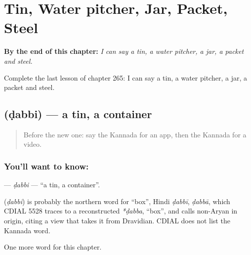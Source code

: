 
\chapter{Tin, Water pitcher, Jar, Packet, Steel}
\label{ch:ka-tin-water-pitcher-jar-packet-steel}

\begin{chapteropening}
\textbf{By the end of this chapter:} \emph{I can say a tin, a water pitcher, a jar, a packet and steel.}

Complete the last lesson of chapter 265: I can say a tin, a water pitcher, a jar, a packet and steel.
\end{chapteropening}

\section[\texorpdfstring{\kn{ಡಬ್ಬಿ} (ḍabbi)}{ಡಬ್ಬಿ (ḍabbi)}]{ (ḍabbi) — a tin, a container}

\label{lesson:KA-C265-dabbi}



\begin{quote}
Before the new one: say the Kannada for an app, then the Kannada for a video.
\end{quote}

\subsection*{You'll want to know: }
\textbf{} — \emph{ḍabbi} — \textquotedblleft{}a tin, a container\textquotedblright{}.

\begin{cousinweb}
\textbf{} (\emph{ḍabbi}) is probably the northern word for \textquotedblleft{}box\textquotedblright{}, Hindi \emph{ḍabbī}, \emph{ḍabbā}, which CDIAL 5528 traces to a reconstructed \emph{*ḍabba}, \textquotedblleft{}box\textquotedblright{}, and calls non-Aryan in origin, citing a view that takes it from Dravidian. CDIAL does not list the Kannada word.
\end{cousinweb}

\begin{grammarlens}[title={What you've built}]
One more word for this chapter.
\end{grammarlens}

